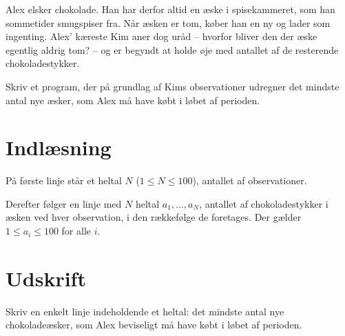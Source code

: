 Alex elsker chokolade.
Han har derfor altid en æske i spisekammeret, som han sommetider smugspiser fra.
Når æsken er tom, køber han en ny og lader som ingenting.
Alex' kæreste Kim aner dog uråd -- hvorfor bliver den der æske egentlig aldrig tom? -- og er begyndt at holde øje med antallet af de resterende chokoladestykker.

Skriv et program, der på grundlag af Kims observationer udregner det mindste antal nye æsker, som Alex må have købt i løbet af perioden.

\section*{Indlæsning}
På første linje står et heltal $N$ ($1 \le N \le 100$), antallet af observationer.

Derefter følger en linje med $N$ heltal $a_1, \ldots, a_N$, antallet af chokoladestykker i æsken ved hver observation, i den rækkefølge de foretages.
Der gælder $1 \le a_i \le 100$ for alle $i$.

\section*{Udskrift}
Skriv en enkelt linje indeholdende et heltal: det mindste antal nye chokoladeæsker, som Alex beviseligt må have købt i løbet af perioden.
